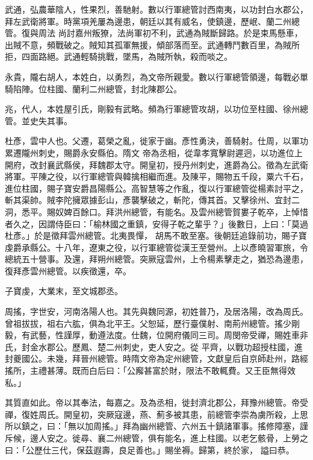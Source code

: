 \begin{pinyinscope}
 武通，弘農華陰人，性果烈，善馳射。數以行軍總管討西南夷，以功封白水郡公，拜左武衛將軍。時黨項羌屢為邊患，朝廷以其有威名，使鎮邊，歷岷、蘭二州總管。復與周法
 尚討嘉州叛獠，法尚軍初不利，武通為賊斷歸路。於是束馬懸車，出賊不意，頻戰破之。賊知其孤軍無援，傾部落而至。武通轉鬥數百里，為賊所拒，四面路絕。武通輕騎挑戰，墜馬，為賊所執，殺而啖之。



 永貴，隴右胡人，本姓白，以勇烈，為文帝所親愛。數以行軍總管領邊，每戰必單騎陷陣。位柱國、蘭利二州總管，封北陳郡公。



 兆，代人，本姓屋引氏，剛毅有武略。頻為行軍總管攻胡，以功位至柱國、徐州總管。並史失其事。



 杜彥，雲中人也。父遷，葛榮之亂，徙家于幽。彥性勇決，善騎射。仕周，以軍功累遷隴州刺史，賜爵永安縣伯。隋文
 帝為丞相，從韋孝寬擊尉遲迥，以功進位上開府，改封襄武縣侯，拜魏郡太守。開皇初，授丹州刺史，進爵為公。徵為左武衛將軍。平陳之役，以行軍總管與韓擒相繼而進。及陳平，賜物五千段，粟六千石，進位柱國，賜子寶安爵昌陽縣公。高智慧等之作亂，復以行軍總管從楊素討平之，斬其渠帥。賊李陀擁眾據彭山，彥襲擊破之，斬陀，傳其首。又擊徐州、宜封二洞，悉平。賜奴婢百餘口。拜洪州總管，有能名。及雲州總管賀婁子乾卒，上悼惜者久之，因謂侍臣曰：「榆林國之重鎮，安得子乾之輩乎？」後數日，上曰：「莫過杜彥。」於是徵拜雲州總管。北夷畏憚，
 胡馬不敢至塞。後朝廷追錄前功，賜子寶虔爵承縣公。十八年，遼東之役，以行軍總管從漢王至營州。上以彥曉習軍旅，令總統五十營事。及還，拜朔州總管。突厥寇雲州，上令楊素擊走之，猶恐為邊患，復拜彥雲州總管。以疾徵還，卒。



 子寶虔，大業末，至文城郡丞。



 周搖，字世安，河南洛陽人也。其先與魏同源，初姓普乃，及居洛陽，改為周氏。曾祖拔拔，祖右六肱，俱為北平王。父恕延，歷行臺僕射、南荊州總管。搖少剛毅，有武藝，性謹厚，動遵法度。仕魏，位開府儀同三司。周閔帝受禪，賜姓車非氏，封金水郡公。歷鳳、楚二州刺史，吏人安之。從
 平齊，以戰功超授柱國，進封夔國公。未幾，拜晉州總管。時隋文帝為定州總管，文獻皇后自京師赴州，路經搖所，主禮甚薄。既而白后曰：「公廨甚富於財，限法不敢輒費。又王臣無得效私。」



 其質直如此。帝以其奉法，每嘉之。及為丞相，徙封濟北郡公，拜豫州總管。帝受禪，復姓周氏。開皇初，突厥寇邊，燕、薊多被其患，前總管李崇為虜所殺，上思所以鎮之，曰：「無以加周搖。」拜為幽州總管、六州五十鎮諸軍事。搖修障塞，謹斥候，邊人安之。徙尋、襄二州總管，俱有能名，進上柱國。以老乞骸骨，上勞之曰：「公歷仕三代，保茲遐壽，良足善也。」賜坐褥。歸第，終於家，
 謚曰恭。




\end{pinyinscope}
